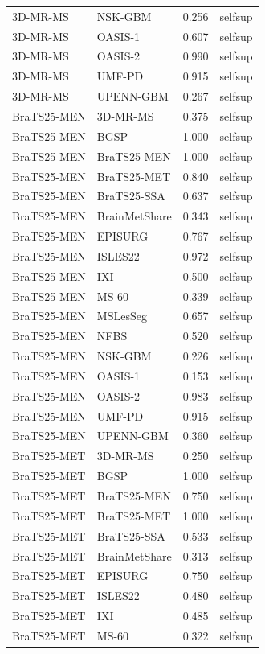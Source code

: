 \begin{tabular}{llrl}
3D-MR-MS & NSK-GBM & 0.256 & selfsup \\
3D-MR-MS & OASIS-1 & 0.607 & selfsup \\
3D-MR-MS & OASIS-2 & 0.990 & selfsup \\
3D-MR-MS & UMF-PD & 0.915 & selfsup \\
3D-MR-MS & UPENN-GBM & 0.267 & selfsup \\
BraTS25-MEN & 3D-MR-MS & 0.375 & selfsup \\
BraTS25-MEN & BGSP & 1.000 & selfsup \\
BraTS25-MEN & BraTS25-MEN & 1.000 & selfsup \\
BraTS25-MEN & BraTS25-MET & 0.840 & selfsup \\
BraTS25-MEN & BraTS25-SSA & 0.637 & selfsup \\
BraTS25-MEN & BrainMetShare & 0.343 & selfsup \\
BraTS25-MEN & EPISURG & 0.767 & selfsup \\
BraTS25-MEN & ISLES22 & 0.972 & selfsup \\
BraTS25-MEN & IXI & 0.500 & selfsup \\
BraTS25-MEN & MS-60 & 0.339 & selfsup \\
BraTS25-MEN & MSLesSeg & 0.657 & selfsup \\
BraTS25-MEN & NFBS & 0.520 & selfsup \\
BraTS25-MEN & NSK-GBM & 0.226 & selfsup \\
BraTS25-MEN & OASIS-1 & 0.153 & selfsup \\
BraTS25-MEN & OASIS-2 & 0.983 & selfsup \\
BraTS25-MEN & UMF-PD & 0.915 & selfsup \\
BraTS25-MEN & UPENN-GBM & 0.360 & selfsup \\
BraTS25-MET & 3D-MR-MS & 0.250 & selfsup \\
BraTS25-MET & BGSP & 1.000 & selfsup \\
BraTS25-MET & BraTS25-MEN & 0.750 & selfsup \\
BraTS25-MET & BraTS25-MET & 1.000 & selfsup \\
BraTS25-MET & BraTS25-SSA & 0.533 & selfsup \\
BraTS25-MET & BrainMetShare & 0.313 & selfsup \\
BraTS25-MET & EPISURG & 0.750 & selfsup \\
BraTS25-MET & ISLES22 & 0.480 & selfsup \\
BraTS25-MET & IXI & 0.485 & selfsup \\
BraTS25-MET & MS-60 & 0.322 & selfsup \\

\end{tabular}
